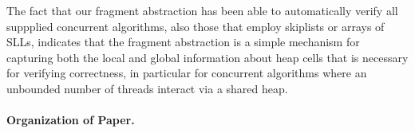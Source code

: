The fact that our fragment abstraction has been able to automatically verify all
suppplied concurrent algorithms, also those that employ skiplists or
arrays of SLLs, indicates that the fragment abstraction is a simple
mechanism for capturing both the local and global information about heap cells
that is necessary for verifying correctness, in particular for
concurrent algorithms where an unbounded number of threads interact
via a shared heap.

\paragraph{Organization of Paper.}

